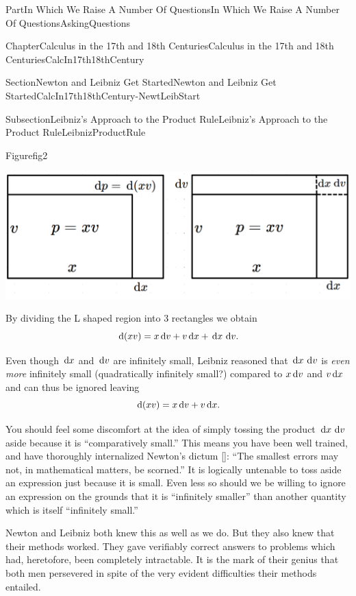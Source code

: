 \documentclass[oneside,10pt,]{book}
\newcommand{\xreffont}{\relax}
\numberwithin{equation}{part}
\newcommand{\dx}[1]{\,{\rm d}#1}
\begin{document}
\begin{partptx}{Part}{In Which We Raise A Number Of Questions}{}{In Which We Raise A Number Of Questions}{}{}{AskingQuestions}
\begin{chapterptx}{Chapter}{Calculus in the 17th and 18th Centuries}{}{Calculus in the 17th and 18th Centuries}{}{}{CalcIn17th18thCentury}
\begin{sectionptx}{Section}{Newton and Leibniz Get Started}{}{Newton and Leibniz Get Started}{}{}{CalcIn17th18thCentury-NewtLeibStart}
\begin{subsectionptx}{Subsection}{Leibniz's Approach to the Product Rule}{}{Leibniz's Approach to the Product Rule}{}{}{LeibnizProductRule}
\begin{figureptx}{Figure}{}{fig2}{}
\begin{image}{0.05}{0.9}{0.05}{}
\includegraphics[width=\linewidth]{external/images/fig2-1.png}
\end{image}%
\tcblower
\end{figureptx}%
By dividing the L shaped region into 3 rectangles we obtain%
\begin{equation}
\dx{(xv)}=x\dx{ v}+v\dx{ x}+\dx{ x}\,\dx{ v}\text{.}\label{eq_LeibnizProductRule}
\end{equation}
%
\par
Even though \(\dx{ x}\) and \(\dx{ v}\) are infinitely small, Leibniz reasoned that \(\dx{ x}\,\dx{ v}\) is \emph{even more} infinitely small (quadratically infinitely small?)  compared to \(x\dx{ v}\) and \(v\dx{ x}\) and can thus be ignored leaving%
\begin{equation*}
\dx{ (xv)}=x\dx{ v}+v\dx{ x}\text{.}
\end{equation*}
%
\par
{} You should feel some discomfort at the idea of simply tossing the product \(\dx{ x}\,\dx{ v}\) aside because it is ``comparatively small.'' This means you have been well trained, and have thoroughly internalized Newton's dictum \hyperlink{newton45__sir_isaac_two_treat_quadr}{[{\xreffont 10}]}: ``The smallest errors may not, in mathematical matters, be scorned.'' It is logically untenable to toss aside an expression just because it is small.  Even less so should we be willing to ignore an expression on the grounds that it is ``infinitely smaller'' than another quantity which is itself ``infinitely small.''%
\par
Newton and Leibniz both knew this as well as we do.  But they also knew that their methods worked.  They gave verifiably correct answers to problems which had, heretofore, been completely intractable.  It is the mark of their genius that both men persevered in spite of the very evident difficulties their methods entailed.%
\end{subsectionptx}
%
%
\typeout{************************************************}

\end{sectionptx}
\end{chapterptx}
\end{partptx}
\end{document}
